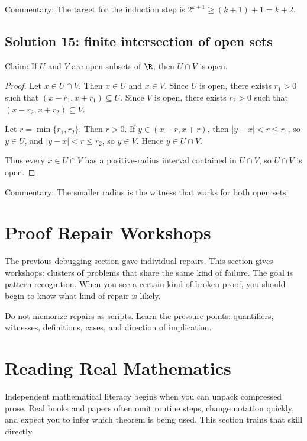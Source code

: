 Commentary: The target for the induction step is $2^{k+1}\geq(k+1)+1=k+2$.

\subsection{Solution 15: finite intersection of open sets}

Claim: If $U$ and $V$ are open subsets of $\R$, then $U\cap V$ is open.

\begin{proof}
Let $x\in U\cap V$. Then $x\in U$ and $x\in V$. Since $U$ is open, there exists $r_1>0$ such that $(x-r_1,x+r_1)\subseteq U$. Since $V$ is open, there exists $r_2>0$ such that $(x-r_2,x+r_2)\subseteq V$.

Let $r=\min\{r_1,r_2\}$. Then $r>0$. If $y\in(x-r,x+r)$, then $|y-x|<r\leq r_1$, so $y\in U$, and $|y-x|<r\leq r_2$, so $y\in V$. Hence $y\in U\cap V$.

Thus every $x\in U\cap V$ has a positive-radius interval contained in $U\cap V$, so $U\cap V$ is open.
\end{proof}

Commentary: The smaller radius is the witness that works for both open sets.

\section{Proof Repair Workshops}
\chapterline

The previous debugging section gave individual repairs. This section gives workshops: clusters of problems that share the same kind of failure. The goal is pattern recognition. When you see a certain kind of broken proof, you should begin to know what kind of repair is likely.

\begin{focusbox}
Do not memorize repairs as scripts. Learn the pressure points: quantifiers, witnesses, definitions, cases, and direction of implication.
\end{focusbox}

\section{Reading Real Mathematics}
\chapterline

Independent mathematical literacy begins when you can unpack compressed prose.
Real books and papers often omit routine steps, change notation quickly, and
expect you to infer which theorem is being used. This section trains that skill
directly.

